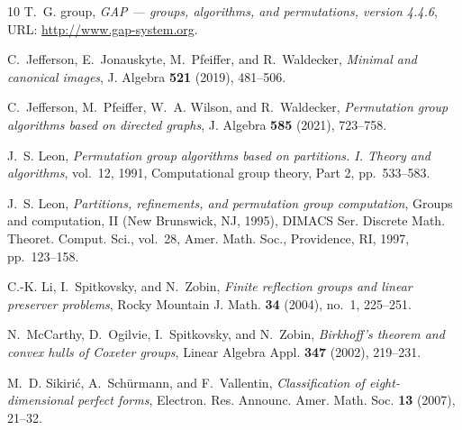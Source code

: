 \documentclass[12pt]{amsart}
\begin{document}
\begin{thebibliography}{10}
T.~G. group, \emph{{GAP} --- groups, algorithms, and permutations, version
  4.4.6}, URL: \url{http://www.gap-system.org}.

C.~Jefferson, E.~Jonauskyte, M.~Pfeiffer, and R.~Waldecker, \emph{Minimal and
  canonical images}, J. Algebra \textbf{521} (2019), 481--506.

C.~Jefferson, M.~Pfeiffer, W.~A. Wilson, and R.~Waldecker, \emph{Permutation
  group algorithms based on directed graphs}, J. Algebra \textbf{585} (2021),
  723--758.

J.~S. Leon, \emph{Permutation group algorithms based on partitions. {I}.
  {T}heory and algorithms}, vol.~12, 1991, Computational group theory, Part 2,
  pp.~533--583.

J.~S. Leon, \emph{Partitions, refinements, and permutation group computation},
  Groups and computation, {II} ({N}ew {B}runswick, {NJ}, 1995), DIMACS Ser.
  Discrete Math. Theoret. Comput. Sci., vol.~28, Amer. Math. Soc., Providence,
  RI, 1997, pp.~123--158.

C.-K. Li, I.~Spitkovsky, and N.~Zobin, \emph{Finite reflection groups and
  linear preserver problems}, Rocky Mountain J. Math. \textbf{34} (2004),
  no.~1, 225--251.

N.~McCarthy, D.~Ogilvie, I.~Spitkovsky, and N.~Zobin, \emph{Birkhoff's theorem
  and convex hulls of {C}oxeter groups}, Linear Algebra Appl. \textbf{347}
  (2002), 219--231.

M.~D. Sikiri\'{c}, A.~Sch\"{u}rmann, and F.~Vallentin, \emph{Classification of
  eight-dimensional perfect forms}, Electron. Res. Announc. Amer. Math. Soc.
  \textbf{13} (2007), 21--32.

\end{thebibliography}
\end{document}
